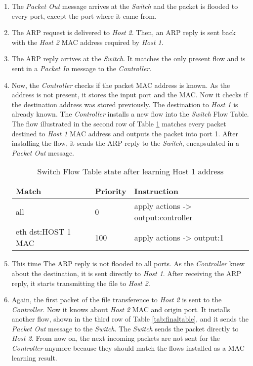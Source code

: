 \begin{enumerate}
\item The \textit{Packet Out} message arrives at the \textit{Switch} and the packet is flooded to every port, except the port where it came from.

\item The ARP request is delivered to \textit{Host 2}. Then, an ARP reply is sent back with the \textit{Host 2} MAC address required by \textit{Host 1}.

\item The ARP reply arrives at the \textit{Switch}. It matches the only present flow and is sent in a \textit{Packet In} message to the  \textit{Controller}.   

\item Now, the  \textit{Controller} checks if the packet MAC address is known. As the address is not present, it stores the input port and the MAC. Now it checks if the destination address was stored previously. The destination to \textit{Host 1} is already known. The  \textit{Controller} installs a new flow into the \textit{Switch} Flow Table. The flow illustrated in the second row of Table \ref{tab:secondtable} matches every packet destined to \textit{Host 1} MAC address and outputs the packet into port 1. After installing the flow, it sends the ARP reply to the \textit{Switch}, encapsulated in a \textit{Packet Out} message.

\begin{table}[H]
\centering
\caption{Switch Flow Table state after learning Host 1 address}
\label{tab:secondtable}
\begin{tabular}{|l|l|l|}
\hline
\textbf{Match}                 & \textbf{Priority}   & \textbf{Instruction}                              \\ \hline
all                            & 0                   & apply actions -> output:controller                \\ \hline
eth dst:HOST 1 MAC             & 100                 & apply actions -> output:1                         \\ \hline
\end{tabular}
\end{table}

\item This time The ARP reply is not flooded to all ports. As the  \textit{Controller} knew about the destination, it is sent directly to \textit{Host 1}. After receiving the ARP reply, it starts transmitting the file to \textit{Host 2}.

\item Again, the first packet of the file transference to \textit{Host 2} is sent to the  \textit{Controller}. Now it knows about \textit{Host 2} MAC and origin port. It installs another flow, shown in the third row of Table \ref{tab:finaltable}, and it sends the \textit{Packet Out} message to the \textit{Switch}. The \textit{Switch} sends the packet directly to \textit{Host 2}. From now on, the next incoming packets are not sent for the \textit{Controller} anymore because they should match the flows installed as a MAC learning result. 


\end{enumerate}
